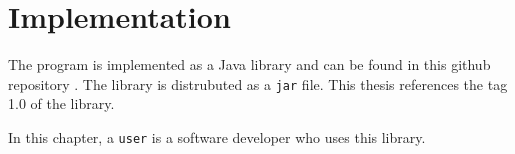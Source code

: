 \section{Implementation}

The program is implemented as a Java library and can be found in this github repository \cite{gp-modifiable-ast}.
The library is distrubuted as a \verb|jar| file.
This thesis references the tag 1.0 of the library.

In this chapter, a \verb|user| is a software developer who uses this library.









